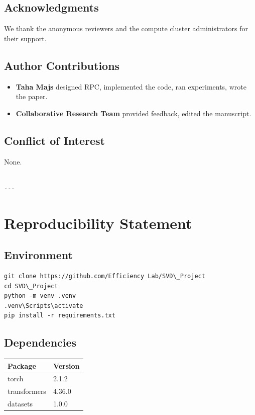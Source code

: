 \subsection{Acknowledgments}

We thank the anonymous reviewers and the compute cluster administrators for their support.

\subsection{Author Contributions}

\begin{itemize}
\item \textbf{Taha Majs} designed RPC, implemented the code, ran experiments,
  wrote the paper.
\item \textbf{Collaborative Research Team} provided feedback, edited the manuscript.

\end{itemize}
\subsection{Conflict of Interest}

None.
\begin{lstlisting}

---
\end{lstlisting}


\section{Reproducibility Statement}

\subsection{Environment}

\begin{lstlisting}
git clone https://github.com/Efficiency Lab/SVD\_Project
cd SVD\_Project
python -m venv .venv
.venv\Scripts\activate
pip install -r requirements.txt
\end{lstlisting}

\subsection{Dependencies}

\begin{table}[H]
\centering
\small
\begin{tabular}{ll}
\toprule
\textbf{Package} & \textbf{Version} \\
\midrule
torch & 2.1.2 \\
transformers & 4.36.0 \\
datasets & 1.0.0 \\
\bottomrule
\end{tabular}
\end{table}

